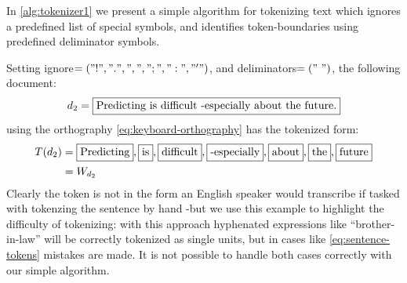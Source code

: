 \begin{example}\label{ex:simple-tokenizer}
  In \autoref{alg:tokenizer1} we present a simple algorithm for tokenizing text which ignores a predefined list of special symbols, and identifies token-boundaries using predefined deliminator symbols.

  Setting {\sffamily ignore}$=("!", ".", ",", ";", ":", "'")$, and {\sffamily deliminators}$=("~")$, the following document:
  \begin{equation*}
    d_2=\text{\fbox{Predicting is difficult -especially about the future.}}
  \end{equation*}
  using the orthography \eqref{eq:keyboard-orthography} has the tokenized form:
  \begin{align}
    T(d_2)&=\text{\fbox{Predicting}}, \text{\fbox{is\vphantom{gt}}}, \text{\fbox{difficult\vphantom{gt}}}, \text{\fbox{-especially\vphantom{gt}}}, \text{\fbox{about\vphantom{gt}}}, \text{\fbox{the\vphantom{gt}}}, \text{\fbox{future\vphantom{gt}}}\label{eq:sentence-tokens}\\
    &=W_{d_2}\nonumber
  \end{align}
  Clearly the token  is not in the form an English speaker would transcribe if tasked with tokenzing the sentence by hand -but we use this example to highlight the difficulty of tokenizing: with this approach hyphenated expressions like ``brother-in-law'' will be correctly tokenized as single units, but in cases like \eqref{eq:sentence-tokens} mistakes are made. It is not possible to handle both cases correctly with our simple algorithm.
\end{example}


